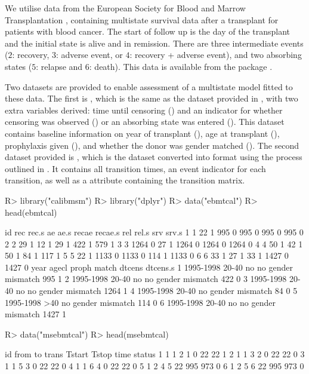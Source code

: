 \documentclass[nojss]{jss}
\begin{document}
We utilise data from the European Society for Blood and Marrow Transplantation \citep{EBMT2023}, containing multistate survival data after a transplant for patients with blood cancer. The start of follow up is the day of the transplant and the initial state is alive and in remission. There are three intermediate events ($2$: recovery, $3$: adverse event, or $4$: recovery + adverse event), and two absorbing states ($5$: relapse and $6$: death). This data is available from the  package \citep{DeWreede2011}.

Two datasets are provided to enable assessment of a multistate model fitted to these data. The first is , which is the same as the  dataset provided in , with two extra variables derived: time until censoring () and an indicator for whether censoring was observed () or an absorbing state was entered (). This dataset contains baseline information on year of transplant (), age at transplant (), prophylaxis given (), and whether the donor was gender matched (). The second dataset provided is , which is the  dataset converted into  format using the process outlined in \cite{DeWreede2011}. It contains all transition times, an event indicator for each transition, as well as a  attribute containing the transition matrix.

\begin{Schunk}
\begin{Sinput}
R> library("calibmsm")
R> library("dplyr")
R> data("ebmtcal")
R> head(ebmtcal)
\end{Sinput}
\begin{Soutput}
  id  rec rec.s   ae ae.s recae recae.s  rel rel.s  srv srv.s
1  1   22     1  995    0   995       0  995     0  995     0
2  2   29     1   12    1    29       1  422     1  579     1
3  3 1264     0   27    1  1264       0 1264     0 1264     0
4  4   50     1   42    1    50       1   84     1  117     1
5  5   22     1 1133    0  1133       0  114     1 1133     0
6  6   33     1   27    1    33       1 1427     0 1427     0
       year agecl proph              match dtcens dtcens.s
1 1995-1998 20-40    no no gender mismatch    995        1
2 1995-1998 20-40    no no gender mismatch    422        0
3 1995-1998 20-40    no no gender mismatch   1264        1
4 1995-1998 20-40    no    gender mismatch     84        0
5 1995-1998   >40    no    gender mismatch    114        0
6 1995-1998 20-40    no no gender mismatch   1427        1
\end{Soutput}
\begin{Sinput}
R> data("msebmtcal")
R> head(msebmtcal)
\end{Sinput}
\begin{Soutput}
  id from to trans Tstart Tstop time status
1  1    1  2     1      0    22   22      1
2  1    1  3     2      0    22   22      0
3  1    1  5     3      0    22   22      0
4  1    1  6     4      0    22   22      0
5  1    2  4     5     22   995  973      0
6  1    2  5     6     22   995  973      0
\end{Soutput}
\end{Schunk}
\end{document}
